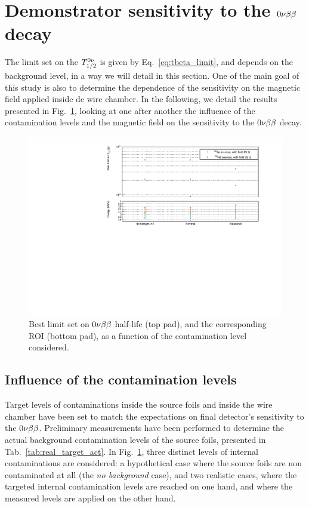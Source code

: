 \section{Demonstrator sensitivity to the $0\nu\beta\beta$ decay}

The limit set on the $T_{1/2}^{0\nu}$ is given by Eq.~\eqref{eq:tbeta_limit}, and depends on the background level, in a way we will detail in this section.
One of the main goal of this study is also to determine the dependence of the sensitivity on the magnetic field applied inside de wire chamber.
In the following, we detail the results presented in Fig.~\ref{fig:real_target_act}, looking at one after another the influence of the contamination levels and the magnetic field on the sensitivity to the $0\nu\beta\beta$ decay.
\begin{figure}[h]
  \centering
  \includegraphics[width=1.1\textwidth]{Sensitivity/fig_sensitivity/contamination_level_Se.pdf}
  \caption{Best limit set on $0\nu\beta\beta$ half-life (top pad), and the corresponding ROI (bottom pad), as a function of the contamination level considered.
    \label{fig:real_target_act}}
\end{figure}

\subsection{Influence of the contamination levels}

Target levels of contaminations inside the source foils and inside the wire chamber have been set to match the expectations on final detector's sensitivity to the $0\nu\beta\beta$.
Preliminary measurements have been performed to determine the actual background contamination levels of the source foils, presented in Tab.~\ref{tab:real_target_act}.
In Fig.~\ref{fig:real_target_act}, three distinct levels of internal contaminations are considered: a hypothetical case where the source foils are non contaminated at all (the \emph{no background} case), and two realistic cases, where the targeted internal contamination levels are reached on one hand, and where the measured levels are applied on the other hand.

